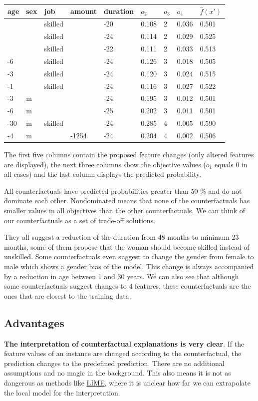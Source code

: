 \documentclass[
  12pt,
]{krantz}
\begin{document}
\begin{longtable}[]{@{}lllllllll@{}}
\toprule
age & sex & job & amount & duration & \(o_2\) & \(o_3\) & \(o_4\) & \(\hat{f}(x')\)\tabularnewline
\midrule
\endhead
& & skilled & & -20 & 0.108 & 2 & 0.036 & 0.501\tabularnewline
& & skilled & & -24 & 0.114 & 2 & 0.029 & 0.525\tabularnewline
& & skilled & & -22 & 0.111 & 2 & 0.033 & 0.513\tabularnewline
-6 & & skilled & & -24 & 0.126 & 3 & 0.018 & 0.505\tabularnewline
-3 & & skilled & & -24 & 0.120 & 3 & 0.024 & 0.515\tabularnewline
-1 & & skilled & & -24 & 0.116 & 3 & 0.027 & 0.522\tabularnewline
-3 & m & & & -24 & 0.195 & 3 & 0.012 & 0.501\tabularnewline
-6 & m & & & -25 & 0.202 & 3 & 0.011 & 0.501\tabularnewline
-30 & m & skilled & & -24 & 0.285 & 4 & 0.005 & 0.590\tabularnewline
-4 & m & & -1254 & -24 & 0.204 & 4 & 0.002 & 0.506\tabularnewline
\bottomrule
\end{longtable}

The first five columns contain the proposed feature changes (only altered features are displayed), the next three columns show the objective values (\(o_1\) equals 0 in all cases) and the last column displays the predicted probability.

All counterfactuals have predicted probabilities greater than 50 \% and do not dominate each other.
Nondominated means that none of the counterfactuals has smaller values in all objectives than the other counterfactuals.
We can think of our counterfactuals as a set of trade-off solutions.

They all suggest a reduction of the duration from 48 months to minimum 23 months, some of them propose that the woman should become skilled instead of unskilled.
Some counterfactuals even suggest to change the gender from female to male which shows a gender bias of the model.
This change is always accompanied by a reduction in age between 1 and 30 years.
We can also see that although some counterfactuals suggest changes to 4 features, these counterfactuals are the ones that are closest to the training data.

\hypertarget{advantages-14}{%
\subsection{Advantages}\label{advantages-14}}

\textbf{The interpretation of counterfactual explanations is very clear}.
If the feature values of an instance are changed according to the counterfactual, the prediction changes to the predefined prediction.
There are no additional assumptions and no magic in the background.
This also means it is not as dangerous as methods like \protect\hyperlink{lime}{LIME}, where it is unclear how far we can extrapolate the local model for the interpretation.
\end{document}
